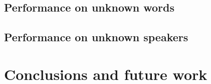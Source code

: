 \documentclass[a4paper]{article}
\begin{document}
		\subsection{Performance on unknown words}
		\subsection{Performance on unknown speakers}
	



	\section{Conclusions and future work}
	\label{sec:conc}
	



  



  \newpage
  \eightpt
  

  

\end{document}
